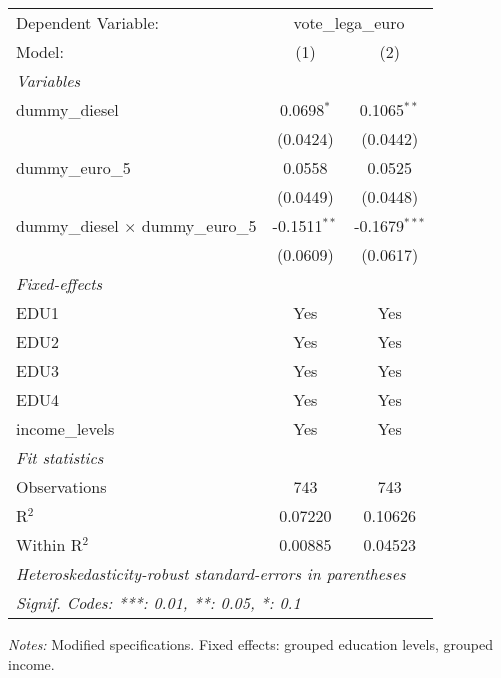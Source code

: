 
\begingroup
\centering
\begin{tabular}{lcc}
   \tabularnewline \midrule \midrule
   Dependent Variable: & \multicolumn{2}{c}{vote\_lega\_euro}\\
   Model:                                    & (1)            & (2)\\  
   \midrule
   \emph{Variables}\\
   dummy\_diesel                             & 0.0698$^{*}$   & 0.1065$^{**}$\\   
                                             & (0.0424)       & (0.0442)\\   
   dummy\_euro\_5                            & 0.0558         & 0.0525\\   
                                             & (0.0449)       & (0.0448)\\   
   dummy\_diesel $\times$ dummy\_euro\_5     & -0.1511$^{**}$ & -0.1679$^{***}$\\   
                                             & (0.0609)       & (0.0617)\\   
   \midrule
   \emph{Fixed-effects}\\
   EDU1                                      & Yes            & Yes\\  
   EDU2                                      & Yes            & Yes\\  
   EDU3                                      & Yes            & Yes\\  
   EDU4                                      & Yes            & Yes\\  
   income\_levels                            & Yes            & Yes\\  
   \midrule
   \emph{Fit statistics}\\
   Observations                              & 743            & 743\\  
   R$^2$                                     & 0.07220        & 0.10626\\  
   Within R$^2$                              & 0.00885        & 0.04523\\  
   \midrule \midrule
   \multicolumn{3}{l}{\emph{Heteroskedasticity-robust standard-errors in parentheses}}\\
   \multicolumn{3}{l}{\emph{Signif. Codes: ***: 0.01, **: 0.05, *: 0.1}}\\
\end{tabular}
 
\par \raggedright 
\textit{Notes:} Modified specifications. Fixed effects: grouped education levels, grouped income.
\par\endgroup


